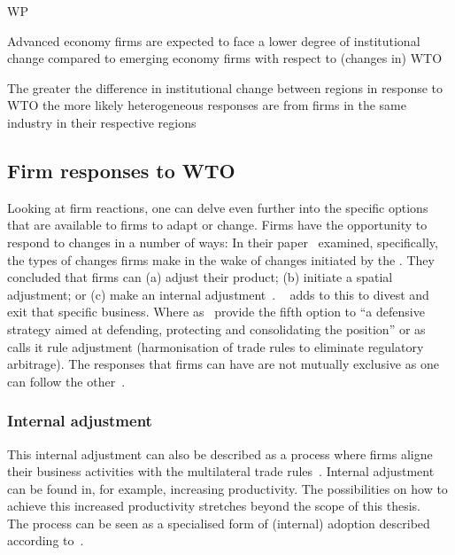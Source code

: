 \begin{subtheorem}{WP}  
 \begin{WP}\label{WP:AE_lower_inst_cha}
Advanced economy firms are expected to face a lower degree of institutional change compared to emerging economy firms with respect to (changes in) WTO \rr 
 \end{WP}
  \begin{WP}\label{WP:greater_diff_heterogeneous_responses}
    The greater the difference in institutional change between regions in response to WTO \rr the more likely heterogeneous responses are from firms in the same industry in their respective regions
  \end{WP}
\end{subtheorem}  

\subsection{Firm responses to WTO \rr}\label{sec:firm_responses_WTO}

Looking at firm reactions, one can delve even further into the specific options that are available to firms to adapt or change.
Firms have the opportunity to respond to changes in a number of ways:
In their paper~\cite{Lawton:2009vw} examined, specifically, the types of changes firms make in the wake of changes initiated by the \wto. 
They concluded that firms can (a) adjust their product; (b) initiate a spatial adjustment; or (c) make an internal adjustment~\citep{Lawton:2005wo,Lawton:2009vw}.
~\cite{Chittoor:2008cj} adds to this to divest and exit that specific business.
Where as~\cite{Chittoor:2008cj} provide the fifth option to ``a defensive strategy aimed at defending, protecting and consolidating the position'' or as~\cite{Lawton:2005wo} calls it rule adjustment (harmonisation of trade rules to eliminate regulatory arbitrage).
The responses that firms can have are not mutually exclusive as one can follow the other~\citep{Chittoor:2008cj,Lawton:2009vw}.

\subsubsection{Internal adjustment}
This internal adjustment can also be described as a process where firms aligne their business activities with the multilateral trade rules~\citep{Lawton:2009vw}.
Internal adjustment can be found in, for example, increasing productivity. 
The possibilities on how to achieve this increased productivity stretches beyond the scope of this thesis.\\
The process can be seen as a specialised form of (internal) adoption described according to~\citep{Cantwell:2009hg}.

